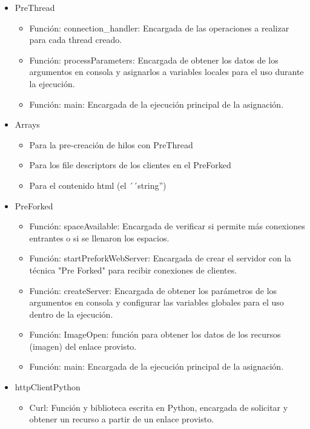 \documentclass{report}
\begin{document}
\begin{itemize}
  \item PreThread
    \begin{itemize}
      \item Función: connection\_handler: Encargada de las operaciones a realizar para cada thread creado.
      \item Función: processParameters: Encargada de obtener los datos de los argumentos en consola y asignarlos a variables locales para el uso durante la ejecución.
      \item Función: main: Encargada de la ejecución principal de la asignación.
    \end{itemize}
  \item Arrays
    \begin{itemize}
      \item Para la pre-creación de hilos con PreThread
      \item Para los file descriptors de los clientes en el PreForked
      \item Para el contenido html (el ´´string'')
    \end{itemize}
    
  \item PreForked
    \begin{itemize}
      \item Función: spaceAvailable: Encargada de verificar si permite más conexiones entrantes o si se llenaron los espacios.
      \item Función: startPreforkWebServer: Encargada de crear el servidor con la técnica "Pre Forked" para recibir conexiones de clientes.
      \item Función: createServer: Encargada de obtener los parámetros de los argumentos en consola y configurar las variables globales para el uso dentro de la ejecución.
      \item Función: ImageOpen: función para obtener los datos de los recursos (imagen) del enlace provisto.
      \item Función: main: Encargada de la ejecución principal de la asignación.
    \end{itemize}
   \item httpClientPython
    \begin{itemize}
      \item Curl: Función y biblioteca escrita en Python, encargada de solicitar y obtener un recurso a partir de un enlace provisto.
    \end{itemize}
    

\end{itemize}
\end{document}
